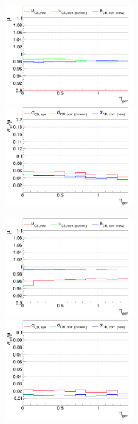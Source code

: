 \begin{figure}
\includegraphics[width=0.495\textwidth]{./plots_pdf/ECAL_plots/plotsPU/EB/FULL/pdf/GENETA/EBFULL_GENETA_0005_0020_MuOverBins.pdf}
\includegraphics[width=0.495\textwidth]{./plots_pdf/ECAL_plots/plotsPU/EB/FULL/pdf/GENETA/EBFULL_GENETA_0005_0020_EffSigmaOverBins.pdf}

\includegraphics[width=0.495\textwidth]{./plots_pdf/ECAL_plots/plotsPU/EB/FULL/pdf/GENETA/EBFULL_GENETA_0020_0100_MuOverBins.pdf}
\includegraphics[width=0.495\textwidth]{./plots_pdf/ECAL_plots/plotsPU/EB/FULL/pdf/GENETA/EBFULL_GENETA_0020_0100_EffSigmaOverBins.pdf}


\end{figure}
